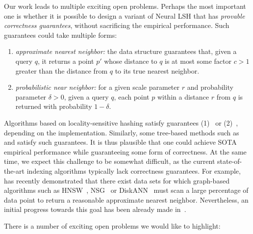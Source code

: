 \documentclass[11pt]{article}
\begin{document}
Our work leads to multiple exciting open problems. Perhaps the most important one is whether it is possible to design a variant of Neural LSH that has {\em provable correctness guarantees}, without sacrificing the empirical performance. Such guarantees could take multiple forms:
\begin{enumerate}
\item {\em approximate nearest neighbor:} the data structure guarantees that, given a query $q$, it returns a point $p'$ whose distance to $q$ is at most some factor $c>1$ greater than the distance from $q$ to its true nearest neighbor.
\item {\em probabilistic near neighbor:} for a given scale parameter $r$ and probability parameter $\delta>0$, given a query $q$, each point $p$ within a distance $r$ from $q$ is returned with probability $1-\delta$.
\end{enumerate}

Algorithms based on locality-sensitive hashing satisfy guarantees (1)~\cite{indyk1998approximate} or (2)~\cite{andoni2005locality}, depending on the implementation. Similarly, some tree-based methods such as~\cite{bawa2005lsh} and \cite{dasgupta2013randomized} satisfy such guarantees. It is thus plausible that one could achieve SOTA empirical performance while guaranteeing some form of correctness. At the same time, we expect this challenge to be somewhat difficult, as the current state-of-the-art indexing algorithms typically lack correctness guarantees. For example,~\cite{haike2023} has recently demonstrated that there exist data sets for which graph-based algorithms such as HNSW~\cite{malkov2018efficient}, NSG~\cite{fu2019fast} or DiskANN~\cite{jayaram2019diskann} must scan a large percentage of data point to return a reasonable approximate nearest neighbor.  
Nevertheless, an initial progress towards this goal has been already made in~\cite{andoni2022learning}.

\iffalse
There is a number of exciting open problems we would like to highlight:
\end{document}
